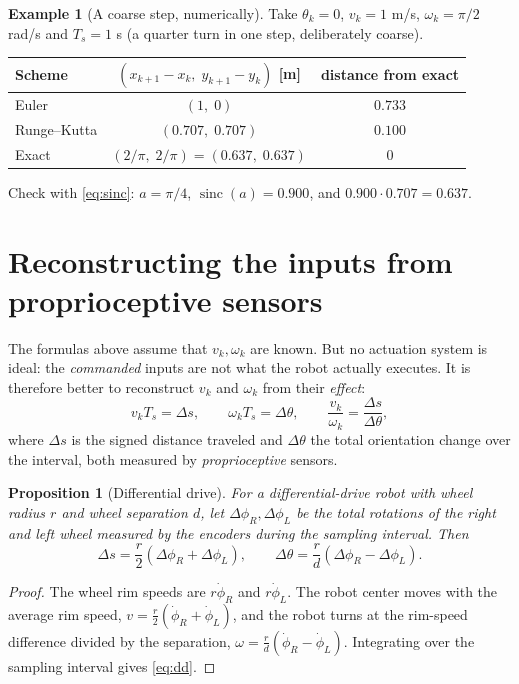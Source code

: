 \documentclass[11pt,a4paper]{article}
\DeclareMathOperator{\sinc}{sinc}
\newcommand{\Ts}{T_s}
\newcommand{\slides}[1]{\texorpdfstring{\hspace{0.5em}{\normalfont\small\emph{(#1)}}}{}}
\theoremstyle{definition}
\newtheorem{example}[definition]{Example}
\theoremstyle{plain}
\newtheorem{proposition}[definition]{Proposition}
\theoremstyle{remark}
\begin{document}
\begin{example}[A coarse step, numerically]
Take $\theta_k=0$, $v_k=1$ m/s, $\omega_k=\pi/2$ rad/s and $\Ts=1$ s (a quarter turn in one step, deliberately coarse).
\begin{center}
\begin{tabular}{lcc}
\toprule
Scheme & $(x_{k+1}-x_k,\;y_{k+1}-y_k)$ [m] & distance from exact\\
\midrule
Euler & $(1,\;0)$ & $0.733$\\
Runge--Kutta & $(0.707,\;0.707)$ & $0.100$\\
Exact & $(2/\pi,\;2/\pi)=(0.637,\;0.637)$ & $0$\\
\bottomrule
\end{tabular}
\end{center}
Check with \eqref{eq:sinc}: $a=\pi/4$, $\sinc(a)=0.900$, and $0.900\cdot0.707=0.637$.
\end{example}

\section{Reconstructing the inputs from proprioceptive sensors \slides{odometry deck, slide 7}}

The formulas above assume that $v_k,\omega_k$ are known. But no actuation system is ideal: the
\emph{commanded} inputs are not what the robot actually executes. It is therefore better to
reconstruct $v_k$ and $\omega_k$ from their \emph{effect}:
\begin{equation}\label{eq:ds}
v_k\Ts=\Delta s,\qquad \omega_k\Ts=\Delta\theta,\qquad \frac{v_k}{\omega_k}=\frac{\Delta s}{\Delta\theta},
\end{equation}
where $\Delta s$ is the signed distance traveled and $\Delta\theta$ the total orientation change over the
interval, both measured by \emph{proprioceptive} sensors.

\begin{proposition}[Differential drive]\label{prop:dd}
For a differential-drive robot with wheel radius $r$ and wheel separation $d$, let
$\Delta\phi_R,\Delta\phi_L$ be the total rotations of the right and left wheel measured by the encoders
during the sampling interval. Then
\begin{equation}\label{eq:dd}
\Delta s=\frac r2(\Delta\phi_R+\Delta\phi_L),\qquad \Delta\theta=\frac rd(\Delta\phi_R-\Delta\phi_L).
\end{equation}
\end{proposition}
\begin{proof}
The wheel rim speeds are $r\dot\phi_R$ and $r\dot\phi_L$. The robot center moves with the average rim
speed, $v=\frac r2(\dot\phi_R+\dot\phi_L)$, and the robot turns at the rim-speed difference divided by the
separation, $\omega=\frac rd(\dot\phi_R-\dot\phi_L)$. Integrating over the sampling interval gives \eqref{eq:dd}.
\end{proof}
\end{document}
